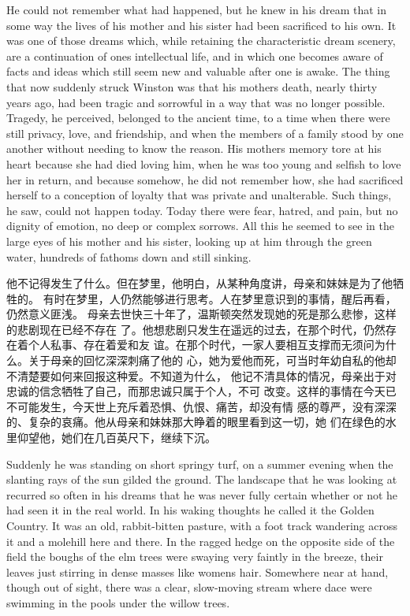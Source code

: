 \begin{paracol}{2}
He could not remember what had happened, but he knew in his dream that
in some way the lives of his mother and his sister had been sacrificed
to his own. It was one of those dreams which, while retaining the
characteristic dream scenery, are a continuation of
one\textquotesingle s intellectual life, and in which one becomes aware
of facts and ideas which still seem new and valuable after one is awake.
The thing that now suddenly struck Winston was that his
mother\textquotesingle s death, nearly thirty years ago, had been tragic
and sorrowful in a way that was no longer possible. Tragedy, he
perceived, belonged to the ancient time, to a time when there were still
privacy, love, and friendship, and when the members of a family stood by
one another without needing to know the reason. His
mother\textquotesingle s memory tore at his heart because she had died
loving him, when he was too young and selfish to love her in return, and
because somehow, he did not remember how, she had sacrificed herself to
a conception of loyalty that was private and unalterable. Such things,
he saw, could not happen today. Today there were fear, hatred, and pain,
but no dignity of emotion, no deep or complex sorrows. All this he
seemed to see in the large eyes of his mother and his sister, looking up
at him through the green water, hundreds of fathoms down and still
sinking.

\switchcolumn

他不记得发生了什么。但在梦里，他明白，从某种角度讲，母亲和妹妹是为了他牺牲的。
有时在梦里，人仍然能够进行思考。人在梦里意识到的事情，醒后再看，仍然意义匪浅。
母亲去世快三十年了，温斯顿突然发现她的死是那么悲惨，这样的悲剧现在已经不存在
了。他想悲剧只发生在遥远的过去，在那个时代，仍然存在着个人私事、存在着爱和友
谊。在那个时代，一家人要相互支撑而无须问为什么。关于母亲的回忆深深刺痛了他的
心，她为爱他而死，可当时年幼自私的他却不清楚要如何来回报这种爱。不知道为什么，
他记不清具体的情况，母亲出于对忠诚的信念牺牲了自己，而那忠诚只属于个人，不可
改变。这样的事情在今天已不可能发生，今天世上充斥着恐惧、仇恨、痛苦，却没有情
感的尊严，没有深深的、复杂的哀痛。他从母亲和妹妹那大睁着的眼里看到这一切，她
们在绿色的水里仰望他，她们在几百英尺下，继续下沉。

\switchcolumn*

Suddenly he was standing on short springy turf, on a summer evening when
the slanting rays of the sun gilded the ground. The landscape that he
was looking at recurred so often in his dreams that he was never fully
certain whether or not he had seen it in the real world. In his waking
thoughts he called it the Golden Country. It was an old, rabbit-bitten
pasture, with a foot track wandering across it and a molehill here and
there. In the ragged hedge on the opposite side of the field the boughs
of the elm trees were swaying very faintly in the breeze, their leaves
just stirring in dense masses like women\textquotesingle s hair.
Somewhere near at hand, though out of sight, there was a clear,
slow-moving stream where dace were swimming in the pools under the
willow trees.


\end{paracol}
